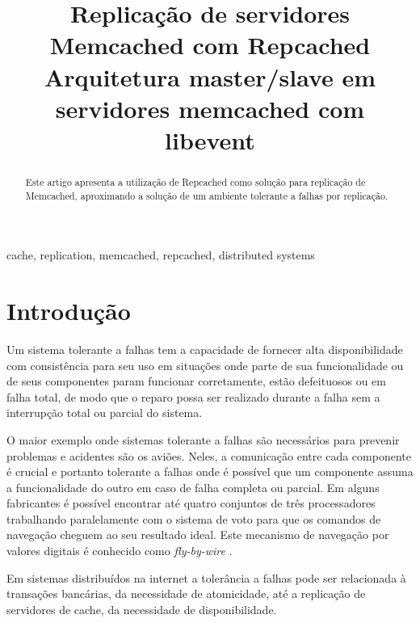 \documentclass[conference]{IEEEtran}
\begin{document}
\title{Replicação de servidores Memcached com Repcached\\
{\footnotesize Arquitetura master/slave em servidores memcached com libevent}
}


\author{
}

\maketitle

\begin{abstract}
Este artigo apresenta a utilização de Repcached como solução para replicação de Memcached, aproximando a solução de um ambiente tolerante a falhas por replicação.
\end{abstract}

\begin{IEEEkeywords}
cache, replication, memcached, repcached, distributed systems
\end{IEEEkeywords}

\section{Introdução}

Um sistema tolerante a falhas tem a capacidade de fornecer alta disponibilidade com consistência para seu uso em situações onde parte de sua funcionalidade ou de seus componentes param funcionar corretamente, estão defeituosos ou em falha total, de modo que o reparo possa ser realizado durante a falha sem a interrupção total ou parcial do sistema. \cite{Tanenbaum:2006:DSP:1202502}

O maior exemplo onde sistemas tolerante a falhas são necessários para prevenir problemas e acidentes são os aviões. Neles, a comunicação entre cada componente é crucial e portanto tolerante a falhas onde é possível que um componente assuma a funcionalidade do outro em caso de falha completa ou parcial. Em alguns fabricantes é possível encontrar até quatro conjuntos de três processadores trabalhando paralelamente com o sistema de voto para que os comandos de navegação cheguem ao seu resultado ideal. Este mecanismo de navegação por valores digitais é  conhecido como \textit{fly-by-wire} \cite{herman}.

Em sistemas distribuídos na internet a tolerância a falhas pode ser relacionada à transações bancárias, da necessidade de atomicidade, até a replicação de servidores de cache, da necessidade de disponibilidade. 
\end{document}
